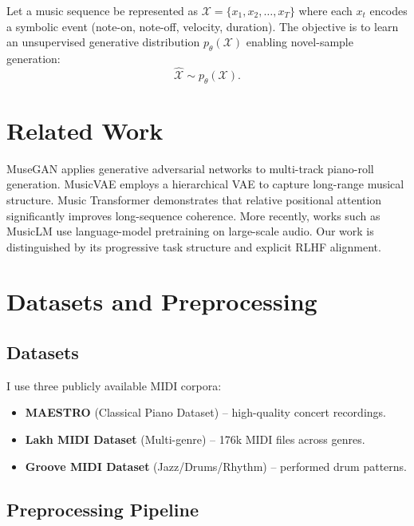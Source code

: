 \documentclass{article}
\begin{document}
Let a music sequence be represented as $\mathcal{X} = \{x_1, x_2, \ldots, x_T\}$
where each $x_t$ encodes a symbolic event (note-on, note-off, velocity, duration).
The objective is to learn an unsupervised generative distribution $p_\theta(\mathcal{X})$
enabling novel-sample generation:
\begin{equation}
  \hat{\mathcal{X}} \sim p_\theta(\mathcal{X}).
\end{equation}

\section{Related Work}

MuseGAN \cite{dong2018musegan} applies generative adversarial networks to
multi-track piano-roll generation.  MusicVAE \cite{roberts2018hierarchical}
employs a hierarchical VAE to capture long-range musical structure.
Music Transformer \cite{huang2018music} demonstrates that relative
positional attention significantly improves long-sequence coherence.
More recently, works such as MusicLM \cite{agostinelli2023musiclm} use
language-model pretraining on large-scale audio.  Our work is distinguished
by its progressive task structure and explicit RLHF alignment.

\section{Datasets and Preprocessing}

\subsection{Datasets}

I use three publicly available MIDI corpora:

\begin{itemize}
  \item \textbf{MAESTRO} (Classical Piano Dataset) – high-quality concert recordings.
  \item \textbf{Lakh MIDI Dataset} (Multi-genre) – 176k MIDI files across genres.
  \item \textbf{Groove MIDI Dataset} (Jazz/Drums/Rhythm) – performed drum patterns.
\end{itemize}

\subsection{Preprocessing Pipeline}
\end{document}
